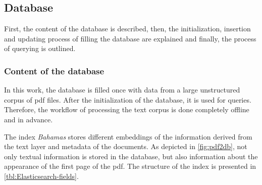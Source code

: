 \subsection{Database}\label{subsec:impl-db}
First, the content of the \databaseName{} database is described, then, the initialization, insertion and updating process of filling the database are explained 
and finally, the process of querying is outlined.

\subsubsection*{Content of the database}
In this work, the database is filled once with data from a large unstructured corpus of \ac{pdf} files.
After the initialization of the database, it is used for queries. 
Therefore, the workflow of processing the text corpus is done completely offline and in advance.

The index \textit{Bahamas} stores different embeddings of the information derived from the text layer and metadata of the documents.
As depicted in \autoref{fig:pdf2db}, not only textual information is stored in the database, 
but also information about the appearance of the first page of the \ac{pdf}.
The structure of the index is presented in \autoref{tbl:Elasticsearch-fields}.

